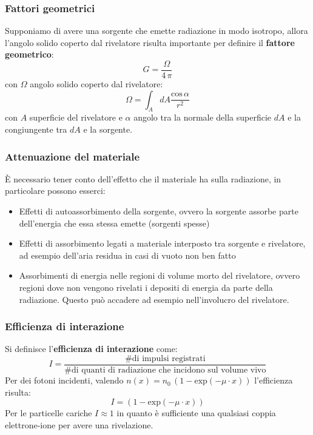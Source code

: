 \subsubsection{Fattori geometrici}
Supponiamo di avere una sorgente che emette radiazione in modo isotropo, allora l'angolo solido coperto dal rivelatore risulta importante
per definire il \textbf{fattore geometrico}:
\begin{equation*}
G = \frac{\Omega}{4 \, \pi}
\end{equation*}
con $\Omega$ angolo solido coperto dal rivelatore:
\begin{equation*}
\Omega = \int_A dA \frac{\text{cos} \, \alpha }{r^2} 
\end{equation*}
con $A$ superficie del rivelatore e $\alpha$ angolo tra la normale della superficie $dA$ e la congiungente tra $dA$ e la sorgente.
\subsubsection{Attenuazione del materiale}
\`E necessario tener conto dell'effetto che il materiale ha sulla radiazione, in particolare possono esserci:
\begin{itemize}
\item Effetti di autoassorbimento della sorgente, ovvero la sorgente assorbe parte dell'energia che essa stessa emette (sorgenti spesse)
\item Effetti di assorbimento legati a materiale interposto tra sorgente e rivelatore, ad esempio dell'aria residua in casi di vuoto non ben fatto
\item Assorbimenti di energia nelle regioni di volume morto del rivelatore, ovvero regioni dove non vengono rivelati i depositi di energia da parte della radiazione.
Questo pu\`o accadere ad esempio nell'involucro del rivelatore.
\end{itemize}
\subsubsection{Efficienza di interazione}
Si definisce l'\textbf{efficienza di interazione} come:
\begin{equation*}
I = \frac{\text{\# di impulsi registrati}}{\text{\# di quanti di radiazione che incidono sul volume vivo}}
\end{equation*}
Per dei fotoni incidenti, valendo $n(x) = n_0 \, (1-\text{exp}(- \mu \cdot x))$ l'efficienza risulta:
\begin{equation*}
I = (1-\text{exp}(- \mu \cdot x))
\end{equation*}
Per le particelle cariche $I \approx 1$ in quanto \`e sufficiente una qualsiasi coppia elettrone-ione per avere una rivelazione.
